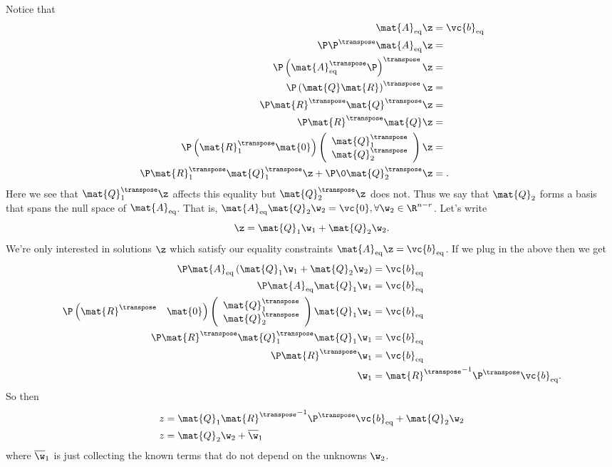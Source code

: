 \documentclass[12pt]{diary}
\renewcommand{\Q}{\mat{Q}}
\newcommand{\RR}{\mat{R}}
\newcommand{\Aeq}{\mat{A}_\textrm{eq}}
\newcommand{\beq}{\vc{b}_\textrm{eq}}
\begin{document}
Notice that 
\begin{align}
\Aeq \z &= \beq \\
\P \P^\transpose \Aeq \z &= \\
\P \left(\Aeq^\transpose \P\right)^\transpose \z &= \\
\P\left(\Q\RR\right)^\transpose \z &= \\
\P \RR^\transpose \Q^\transpose \z &= \\
\P \RR^\transpose \Q \z &= \\
\P \left(\RR_1^\transpose \mat{0}\right)
  \left(\begin{array}{c}
  \Q_1^\transpose\\
  \Q_2^\transpose
  \end{array}\right) \z &=\\
\P \RR_1^\transpose \Q_1^\transpose \z + \P \0 \Q_2^\transpose \z &= .
\end{align}
Here we see that $\Q_1^\transpose \z$ affects this equality but
$\Q_2^\transpose \z$ does not. Thus
we say that $\Q_2$ forms a basis that spans the null space of $\Aeq$. That is,
$\Aeq \Q_2 \w_2 =
\vc{0},
\forall \w_2 \in \R^{n-r}$. Let's write 
\begin{equation}
\z = \Q_1 \w_1 + \Q_2 \w_2.
\end{equation}
We're only interested in solutions $\z$ which satisfy our equality constraints
$\Aeq \z = \beq$. If we plug in the above then we get
\begin{align}
\P \Aeq \left(\Q_1 \w_1 + \Q_2 \w_2\right) &= \beq \\
\P \Aeq \Q_1 \w_1 &= \beq \\
\P \left(\RR^\transpose \quad
\mat{0}\right)\left(\begin{array}{c}\Q_1^\transpose\\
\Q_2^\transpose\end{array}\right) \Q_1 \w_1 &= \beq \\
\P \RR^\transpose \Q_1^\transpose \Q_1 \w_1 &= \beq \\
\P \RR^\transpose \w_1 &= \beq \\
\w_1 &= {\RR^\transpose}^{-1} \P^\transpose \beq.
\end{align}
So then
\begin{align}
z &= \Q_1 {\RR^\transpose}^{-1} \P^\transpose \beq  + \Q_2 \w_2 \\
z &= \Q_2 \w_2 + \overline{\w}_1\\
\end{align}
where $\overline{\w}_1$ is just collecting the known terms that do not depend on the
unknowns $\w_2$.
\end{document}
